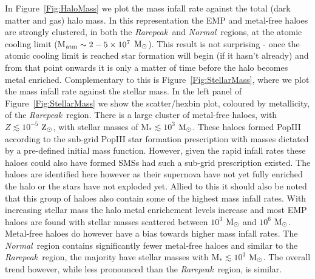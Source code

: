 \documentclass[graphics, twocolumn, usenatbib]{mn2e}
\newcommand{\msolar} {$\rm{M_{\odot}}~$}
\newcommand{\msolarc} {$\rm{M_{\odot}}$}
\newcommand{\zsolarc} {$\rm{Z_{\odot}}$}
\newcommand{\rarepeak} {\textit{Rarepeak~}}
\newcommand{\normal} {\textit{Normal~}}
\begin{document}
In Figure~\ref{Fig:HaloMass} we plot the mass infall rate against the total (dark matter
and gas) halo mass. In this representation the EMP and metal-free haloes are strongly clustered, in both
the \rarepeak and \normal regions, at the atomic cooling limit (M$_{\rm atm} \sim 2 - 5 \times 10^7$
\msolarc). This result is not surprising - once the atomic cooling limit is reached star formation
will begin (if it hasn't already) and from that point onwards it is only a matter of time before
the halo becomes metal enriched. Complementary to this is Figure~\ref{Fig:StellarMass}, 
where we plot the mass infall rate against the stellar mass. In the left panel of Figure~\ref{Fig:StellarMass} we show the scatter/hexbin plot, coloured by metallicity, of the
\rarepeak region. There is a large cluster of metal-free haloes, with $Z \lesssim 10^{-5}$ \zsolarc,
with stellar masses of M$_{*} \lesssim 10^3$ \msolarc. These haloes formed PopIII
according to the sub-grid PopIII star formation prescription with masses dictated 
by a pre-defined initial mass function. However, given the rapid infall rates these 
haloes could also have formed SMSs had such a sub-grid prescription existed. The
haloes are identified here however as their supernova have not yet fully enriched the 
halo or the stars have not exploded yet. Allied to this 
it should also be noted that this group of haloes also contain some of the highest mass infall
rates. With increasing stellar mass the halo metal enrichement levels increase and most EMP haloes
are found with stellar masses scattered between $10^{3}$ \msolar and $10^{6}$ \msolarc. Metal-free haloes
do however have a bias towards higher mass infall rates. The \normal region contains significantly fewer metal-free haloes and
similar to the \rarepeak region, the majority have stellar masses
with M$_{*} \lesssim 10^3$ \msolarc. The overall trend however, while less pronounced than the \rarepeak region, is
similar. 
\end{document}
